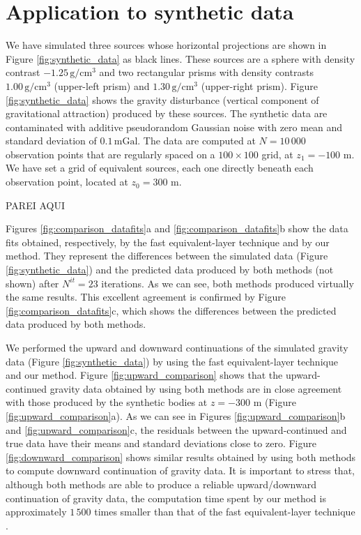 \section{Application to synthetic data}

We have simulated three sources whose horizontal projections are shown in 
Figure \ref{fig:synthetic_data} as black lines. 
These sources are a sphere with density contrast  
$-1.25\, \mathrm{g/cm^3}$ and two rectangular prisms with density contrasts 
$1.00\, \mathrm{g/cm^3}$ (upper-left prism) 
and $1.30\, \mathrm{g/cm^3}$ (upper-right prism). 
Figure \ref{fig:synthetic_data} shows the gravity disturbance (vertical component of 
gravitational attraction) produced by these sources. 
The synthetic data are contaminated with additive pseudorandom Gaussian 
noise with zero mean and standard deviation of $0.1 \, \mathrm{mGal}$.
The data are computed at $N = 10\,000$ observation points that are regularly spaced on a 
$100 \times 100$ grid, at $z_{1} = -100$ m. 
We have set a grid of equivalent sources, each one directly beneath each 
observation point, located at $z_{0} = 300$ m. 

PAREI AQUI

Figures \ref{fig:comparison_datafits}a and \ref{fig:comparison_datafits}b show the data fits 
obtained, respectively, by the fast equivalent-layer technique \citep{siqueira-etal2017} 
and by our method. They represent the differences between the simulated data (Figure \ref{fig:synthetic_data}) and the predicted data produced by both methods 
(not shown) after $N^{it} = 23$ iterations. 
As we can see, both methods produced virtually the same results.
This excellent agreement is confirmed by Figure \ref{fig:comparison_datafits}c, which shows 
the differences between the predicted data produced by both methods.

We performed the upward and downward continuations of the simulated gravity data 
(Figure \ref{fig:synthetic_data}) by using the fast equivalent-layer technique 
and our method.
Figure \ref{fig:upward_comparison} shows that the upward-continued gravity data obtained 
by using both methods are in close agreement with those produced by the synthetic 
bodies at $z = -300$ m (Figure \ref{fig:upward_comparison}a).
As we can see in Figures \ref{fig:upward_comparison}b and \ref{fig:upward_comparison}c,
the residuals between the upward-continued and true data have their means and standard 
deviations close to zero. 
Figure \ref{fig:downward_comparison} shows similar results obtained by using both 
methods to compute downward continuation of gravity data.
It is important to stress that, although both methods are able to produce a reliable 
upward/downward continuation of gravity data, the computation time spent by our method 
is approximately $1\,500$ times smaller than that of the fast equivalent-layer 
technique \citep{siqueira-etal2017}. 